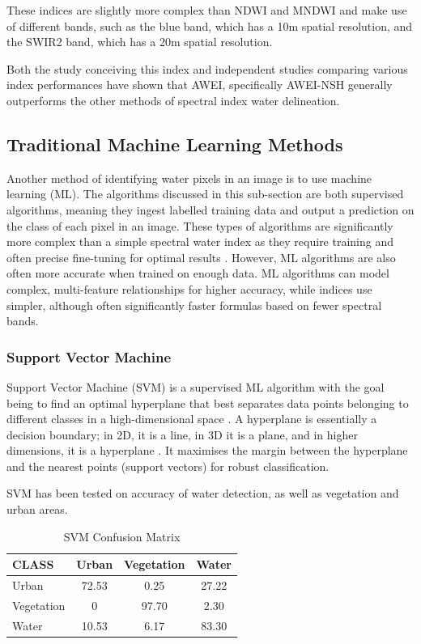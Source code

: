 These indices are slightly more complex than NDWI and MNDWI and make use of different bands, such as the blue band, which has a 10m spatial resolution, and the SWIR2 band, which has a 20m spatial resolution. 

Both the study conceiving this index \citep{feyisa_gudina_meilby_fensholt_proud_2014b} and independent studies comparing various index performances \citep{kirby_ferguson_rennie_cousineau_nistor_2024} have shown that AWEI, specifically AWEI-NSH generally outperforms the other methods of spectral index water delineation. 

\subsection{Traditional Machine Learning Methods}
Another method of identifying water pixels in an image is to use machine learning (ML). The algorithms discussed in this sub-section are both supervised algorithms, meaning they ingest labelled training data and output a prediction on the class of each pixel in an image. These types of algorithms are significantly more complex than a simple spectral water index as they require training and often precise fine-tuning for optimal results \citep{vapnik_vladimir_n_1997}. However, ML algorithms are also often more accurate when trained on enough data. ML algorithms can model complex, multi-feature relationships for higher accuracy, while indices use simpler, although often significantly faster formulas based on fewer spectral bands.

\subsubsection{Support Vector Machine}
Support Vector Machine (SVM) is a supervised ML algorithm with the goal being to find an optimal hyperplane that best separates data points belonging to different classes in a high-dimensional space \citep{berwick_2003}. A hyperplane is essentially a decision boundary; in 2D, it is a line, in 3D it is a plane, and in higher dimensions, it is a hyperplane \citep{ktena_sotiras_ferrante_schirmer_arichi_chung_2023}. It maximises the margin between the hyperplane and the nearest points (support vectors) for robust classification.

SVM has been tested on accuracy of water detection, \citep{maity_2016} as well as vegetation and urban areas. 

\begin{table}[ht]
    \centering
    \begin{tabular}{|l|c|c|c|}
        \hline
        CLASS & Urban & Vegetation & Water \\
        \hline
        Urban & 72.53 & 0.25 & 27.22 \\
        Vegetation & 0 & 97.70 & 2.30 \\
        Water & 10.53 & 6.17 & 83.30 \\
        \hline
    \end{tabular}
    \caption{SVM Confusion Matrix \citep{maity_2016}}
    \label{tab:LR SVM confusion matrix}
\end{table}

